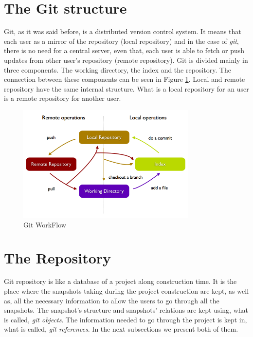 \section{The Git structure}
Git, as it was said before, is a distributed version control system.
It means that each user as a mirror of the repository (local
repository) and in the case of
\emph{git}, there is no need for a central server, even that, each user is able to
fetch or push updates from other user's repository (remote repository).
Git is divided mainly in three components. The working directory,
the index and the repository. The connection between these components
can be seen in Figure \ref{fig:git_structure}. Local and remote
repository have the same internal structure. What is a local
repository for an user is a remote repository for another user.

\begin{figure}[!t]
   \centering
   \includegraphics[width=0.8\textwidth]{images/git_workflow.png}
   \caption{Git WorkFlow}\label{fig:git_structure}
\end{figure}

\section{The Repository}
Git repository is like a database of a project along construction time. It is
the place where the snapshots taking during the project construction
are kept, as well as, all the necessary information to
allow the users to go through all the snapshots. The snapshot's
structure and snapshots' relations are kept using, what is called, \emph{git
objects}. The information needed to go through the project is kept in,
what is called, \emph{git references}. In the next subsections we
present both of them.



